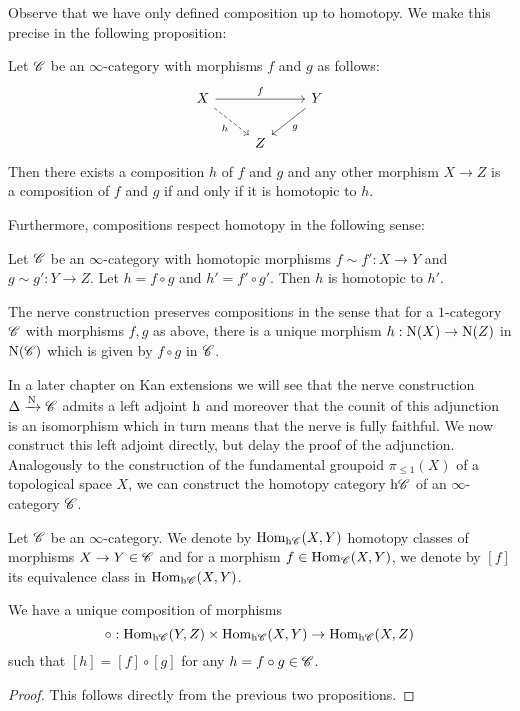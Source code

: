 \documentclass[../thesis.tex]{subfiles}
\begin{document}
Observe that we have only defined composition up to homotopy.
We make this precise in the following proposition:
\begin{proposition}
    Let $\mathscr{C}$ be an $\infty$-category with morphisms $f$ and $g$ as follows:
    \[\begin{tikzcd}
            X && Y \\
            & Z
            \arrow["f", from=1-1, to=1-3]
            \arrow["g", from=1-3, to=2-2]
            \arrow["h"', dashed, from=1-1, to=2-2]
        \end{tikzcd}\]
    Then there exists a composition $h$ of $f$ and $g$ and any other morphism $X\to Z$ is a composition of $f$ and $g$ if and only if it is homotopic to $h$.
\end{proposition}
Furthermore, compositions respect homotopy in the following sense:
\begin{proposition}
    Let $\mathscr{C}$ be an $\infty$-category with homotopic morphisms $f \sim f':X \to Y$ and $g \sim g': Y \to Z$.
    Let $h=f\circ g$ and $h' = f' \circ g'$.
    Then $h$ is homotopic to $h'$.
\end{proposition}
\begin{remark}
    The nerve construction preserves compositions in the sense that for a $1$-category $\mathscr{C}$ with morphisms $f,g$ as above, there is a unique morphism $h:\mathrm{N}(X)\to \mathrm{N}(Z)$ in $\mathrm{N}(\mathscr{C})$ which is given by $f\circ g$ in $\mathscr{C}$.
\end{remark}
In a later chapter on Kan extensions we will see that the nerve construction $\Delta \xrightarrow{\mathrm{N}} \mathscr{C}$ admits a left adjoint $\mathrm{h}$ and moreover that the counit of this adjunction is an isomorphism which in turn means that the nerve is fully faithful.
We now construct this left adjoint directly, but delay the proof of the adjunction.
Analogously to the construction of the fundamental groupoid $\pi_{\leq 1}(X)$ of a topological space $X$, we can construct the homotopy category $\mathrm{h}\mathscr{C}$ of an $\infty$-category $\mathscr{C}$.
\begin{definition}
    Let $\mathscr{C}$ be an $\infty$-category.
    We denote by $\mathrm{Hom}_{\mathrm{h}\mathscr{C}}(X,Y)$ homotopy classes of morphisms $X\to Y \in \mathscr{C}$ and for a morphism $f \in \mathrm{Hom}_{\mathscr{C}}(X,Y)$, we denote by $[f]$ its equivalence class in $\mathrm{Hom}_{\mathrm{h}\mathscr{C}}(X,Y)$.
\end{definition}
\begin{proposition}
    We have a unique composition of morphisms
    \[
        \circ : \mathrm{Hom}_{\mathrm{h}\mathscr{C}}(Y, Z) \times \mathrm{Hom}_{\mathrm{h}\mathscr{C}}(X, Y) \rightarrow \mathrm{Hom}_{\mathrm{h}\mathscr{C}}(X, Z)
    \]
    such that $[h] = [f] \circ [g]$ for any $h = f\circ g \in \mathscr{C}$.
\end{proposition}
\begin{proof}
    This follows directly from the previous two propositions.
\end{proof}
\end{document}
